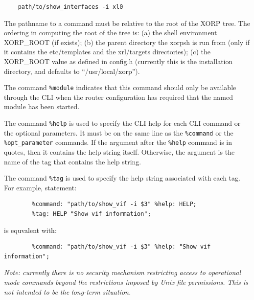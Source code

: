 \documentclass[11pt]{article}
\begin{document}
\begin{verbatim}
    path/to/show_interfaces -i xl0
\end{verbatim}

The pathname to a command must be
relative to the root of the XORP tree. The ordering in computing the root of
the tree is: (a) the shell environment XORP\_ROOT (if exists); (b) the parent
directory the xorpsh is run from (only if it contains the
etc/templates and the xrl/targets directories); (c) the XORP\_ROOT value as
defined in config.h (currently this is the installation directory, and
defaults to ``/usr/local/xorp'').

The command {\tt \%module} indicates that this command should only be
available through the CLI when the router configuration has required
that the named module has been started.

The command {\tt \%help} is used to specify the CLI help for each
CLI command or the optional parameters.
It must be on the same line as the {\tt \%command} or the
{\tt \%opt\_parameter} commands. If the argument after the {\tt \%help}
command is in quotes, then it contains the help string itself.
Otherwise, the argument is the name of the tag that contains the help
string.

The command {\tt \%tag} is used to specify the help string associated
with each tag. For example, statement:

\begin{verbatim}
        %command: "path/to/show_vif -i $3" %help: HELP;
        %tag: HELP "Show vif information";
\end{verbatim}

is equvalent with:

\begin{verbatim}
        %command: "path/to/show_vif -i $3" %help: "Show vif information";
\end{verbatim}

\textit{Note: currently there is no security mechanism restricting
access to operational mode commands beyond the restrictions imposed by
Unix file permissions.  This is not intended to be the long-term
situation.}
\end{document}
